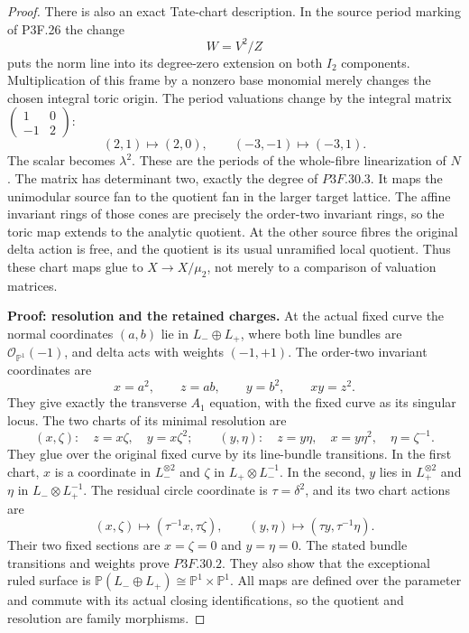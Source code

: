 \begin{proof}
There is also an exact Tate-chart description. In the source period marking of P3F.26 the change \[
                        W=V^2/Z
\] puts the norm line into its degree-zero extension on both \(I_2\) components. Multiplication of this frame by a nonzero base monomial merely changes the chosen integral toric origin. The period valuations change by the integral matrix \((\begin{smallmatrix}1&0\\-1&2\end{smallmatrix})\): \[
 (2,1)\longmapsto(2,0),\qquad
 (-3,-1)\longmapsto(-3,1).
\] The scalar becomes \(\lambda^2\). These are the periods of the whole-fibre linearization of \(N\). The matrix has determinant two, exactly the degree of \(P3F.30.3\). It maps the unimodular source fan to the quotient fan in the larger target lattice. The affine invariant rings of those cones are precisely the order-two invariant rings, so the toric map extends to the analytic quotient. At the other source fibres the original delta action is free, and the quotient is its usual unramified local quotient. Thus these chart maps glue to \(X\to X/\mu_2\), not merely to a comparison of valuation matrices.

\textbf{Proof: resolution and the retained charges.} At the actual fixed curve the normal coordinates \((a,b)\) lie in \(L_-\oplus L_+\), where both line bundles are \(\mathcal O_{\mathbb P^1}(-1)\), and delta acts with weights \((-1,+1)\). The order-two invariant coordinates are \[
 x=a^2,\qquad z=ab,\qquad y=b^2,
 \qquad xy=z^2.
\] They give exactly the transverse \(A_1\) equation, with the fixed curve as its singular locus. The two charts of its minimal resolution are \[
 (x,\zeta):\quad z=x\zeta,\quad y=x\zeta^2;
 \qquad
 (y,\eta):\quad z=y\eta,\quad x=y\eta^2,
 \quad\eta=\zeta^{-1}.
\] They glue over the original fixed curve by its line-bundle transitions. In the first chart, \(x\) is a coordinate in \(L_-^{\otimes2}\) and \(\zeta\) in \(L_+\otimes L_-^{-1}\). In the second, \(y\) lies in \(L_+^{\otimes2}\) and \(\eta\) in \(L_-\otimes L_+^{-1}\). The residual circle coordinate is \(\tau=\delta^2\), and its two chart actions are \[
 (x,\zeta)\longmapsto(\tau^{-1}x,\tau\zeta),
 \qquad
 (y,\eta)\longmapsto(\tau y,\tau^{-1}\eta).
\] Their two fixed sections are \(x=\zeta=0\) and \(y=\eta=0\). The stated bundle transitions and weights prove \(P3F.30.2\). They also show that the exceptional ruled surface is \(\mathbb P(L_-\oplus L_+)\cong\mathbb P^1\times\mathbb P^1\). All maps are defined over the parameter and commute with its actual closing identifications, so the quotient and resolution are family morphisms.


\end{proof}
